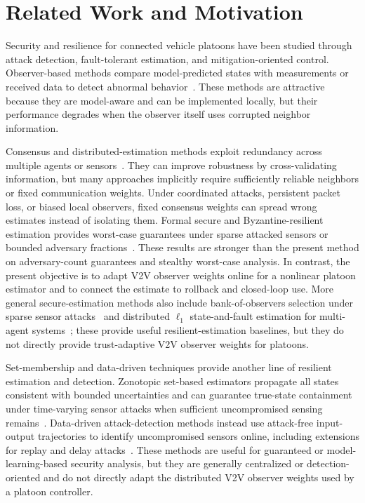 \documentclass[letterpaper,journal]{IEEEtran}
\begin{document}
\section{Related Work and Motivation}\label{sec_related_work}
Security and resilience for connected vehicle platoons have been studied through attack detection, fault-tolerant estimation, and mitigation-oriented control. Observer-based methods compare model-predicted states with measurements or received data to detect abnormal behavior~\cite{jeon2020simultaneous,yamamoto2021attack,huang2022detection,2_obs_Angelo}. These methods are attractive because they are model-aware and can be implemented locally, but their performance degrades when the observer itself uses corrupted neighbor information.

Consensus and distributed-estimation methods exploit redundancy across multiple agents or sensors~\cite{Guitao_multi_mesure,Consensus_discret_Saber,Plug_play}. They can improve robustness by cross-validating information, but many approaches implicitly require sufficiently reliable neighbors or fixed communication weights. Under coordinated attacks, persistent packet loss, or biased local observers, fixed consensus weights can spread wrong estimates instead of isolating them. Formal secure and Byzantine-resilient estimation provides worst-case guarantees under sparse attacked sensors or bounded adversary fractions~\cite{fawzi2014secure,mitra2018byzantine,khazraei2020attack_auth}. These results are stronger than the present method on adversary-count guarantees and stealthy worst-case analysis. In contrast, the present objective is to adapt V2V observer weights online for a nonlinear platoon estimator and to connect the estimate to rollback and closed-loop use. More general secure-estimation methods also include bank-of-observers selection under sparse sensor attacks~\cite{chong2021secure} and distributed $\ell_1$ state-and-fault estimation for multi-agent systems~\cite{hashimoto2020distributed_l1}; these provide useful resilient-estimation baselines, but they do not directly provide trust-adaptive V2V observer weights for platoons.

Set-membership and data-driven techniques provide another line of resilient estimation and detection. Zonotopic set-based estimators propagate all states consistent with bounded uncertainties and can guarantee true-state containment under time-varying sensor attacks when sufficient uncompromised sensing remains~\cite{niazi2023resilient_set}. Data-driven attack-detection methods instead use attack-free input-output trajectories to identify uncompromised sensors online, including extensions for replay and delay attacks~\cite{coimbatore2025data_driven_attack}. These methods are useful for guaranteed or model-learning-based security analysis, but they are generally centralized or detection-oriented and do not directly adapt the distributed V2V observer weights used by a platoon controller.
\end{document}
